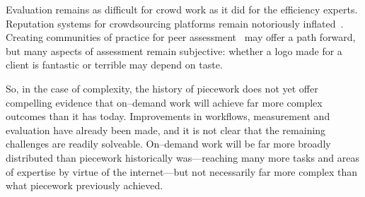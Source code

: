 \documentclass[trackingWork]{subfiles}
\begin{document}
Evaluation remains as difficult for crowd work as it did for the efficiency experts. 
Reputation systems for crowdsourcing platforms remain notoriously inflated~\cite{Horton2015a}.
Creating communities of practice for peer assessment~\cite{crowdguilds} may offer a path forward, but many aspects of assessment remain subjective: whether a logo made for a client is fantastic or terrible may depend on taste.

So, in the case of complexity, the history of piecework does not yet offer compelling evidence that on--demand work will achieve far more complex outcomes than it has today.
Improvements in workflows, measurement and evaluation have already been made, and it is not clear that the remaining challenges are readily solveable.
On--demand work will be far more broadly distributed than piecework historically was---reaching many more tasks and areas of expertise by virtue of the internet---but not necessarily far more complex than what piecework previously achieved.




\end{document}
